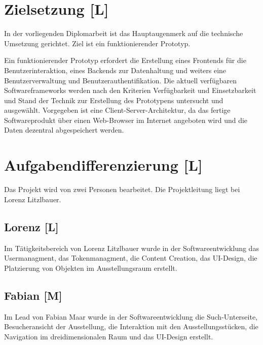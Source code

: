 \section{Zielsetzung [L]}
In der vorliegenden Diplomarbeit ist das Hauptaugenmerk auf die technische Umsetzung gerichtet. Ziel ist ein funktionierender Prototyp.

Ein funktionierender Prototyp erfordert die Erstellung eines Frontends für die Benutzerinteraktion, eines Backends zur Datenhaltung und weiters eine Benutzerverwaltung und Benutzerauthentifikation. Die aktuell verfügbaren Softwareframeworks werden nach den Kriterien Verfügbarkeit und Einsetzbarkeit und Stand der Technik zur Erstellung des Prototypens untersucht und ausgewählt. Vorgegeben ist eine Client-Server-Architektur, da das fertige Softwareprodukt über einen Web-Browser im Internet angeboten wird und die Daten dezentral abgespeichert werden.

\section{Aufgabendifferenzierung [L]}
Das Projekt wird von zwei Personen bearbeitet. Die Projektleitung liegt bei Lorenz Litzlbauer. 

\subsection{Lorenz [L]}
Im Tätigkeitsbereich von Lorenz Litzlbauer wurde in der Softwareentwicklung das 
Usermanagment, 
das Tokenmanagment,
die Content Creation,
das UI-Design, 
die Platzierung von Objekten im Ausstellungsraum erstellt.

\subsection{Fabian [M]}
Im Lead von Fabian Maar wurde in der Softwareentwicklung die Such-Unterseite, Besucheransicht der Ausstellung, die Interaktion mit den Ausstellungsstücken, die Navigation im dreidimensionalen Raum und das UI-Design erstellt.
	
